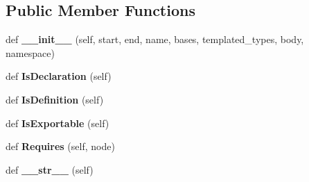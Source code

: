 \subsection*{Public Member Functions}
\begin{DoxyCompactItemize}
\item 
\mbox{\label{classtests_1_1libs_1_1googletest-master_1_1googlemock_1_1scripts_1_1generator_1_1cpp_1_1ast_1_1Class_ab157496405b4fae5b4084313152d512d}} 
def {\bfseries \+\_\+\+\_\+init\+\_\+\+\_\+} (self, start, end, name, bases, templated\+\_\+types, body, namespace)
\item 
\mbox{\label{classtests_1_1libs_1_1googletest-master_1_1googlemock_1_1scripts_1_1generator_1_1cpp_1_1ast_1_1Class_a719128780333ec3d2ec4dfe39d5f1ff9}} 
def {\bfseries Is\+Declaration} (self)
\item 
\mbox{\label{classtests_1_1libs_1_1googletest-master_1_1googlemock_1_1scripts_1_1generator_1_1cpp_1_1ast_1_1Class_abde150231c218d2cee2915bf50cde4d3}} 
def {\bfseries Is\+Definition} (self)
\item 
\mbox{\label{classtests_1_1libs_1_1googletest-master_1_1googlemock_1_1scripts_1_1generator_1_1cpp_1_1ast_1_1Class_a0cde8acb2cbd0c23b2560041cf7fc6de}} 
def {\bfseries Is\+Exportable} (self)
\item 
\mbox{\label{classtests_1_1libs_1_1googletest-master_1_1googlemock_1_1scripts_1_1generator_1_1cpp_1_1ast_1_1Class_a25ea5100bc55514cd12f527ce825fcdc}} 
def {\bfseries Requires} (self, node)
\item 
\mbox{\label{classtests_1_1libs_1_1googletest-master_1_1googlemock_1_1scripts_1_1generator_1_1cpp_1_1ast_1_1Class_a250f7d47b4b8f401b15f6792e3c00ba8}} 
def {\bfseries \+\_\+\+\_\+str\+\_\+\+\_\+} (self)
\end{DoxyCompactItemize}
